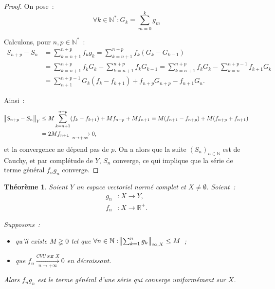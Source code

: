 \documentclass{report}
\newtheorem{thm}{Théorème}[chapter]
\theoremstyle{definition}
\theoremstyle{remark}
\numberwithin{equation}{section}
\newcommand{\R}{\mathbb R}
\newcommand{\Rp}{\R^{+}}
\newcommand{\N}{\mathbb N}
\newcommand{\Ns}{\N^{*}}
\newcommand{\seq}[3]{\left(#1_{#2}\right)_{#2 \in #3}}
\newcommand{\CONV}[5]{\xrightarrow[#2 \to #3]{#4 \text{ #5 } #1}}
\newcommand{\CVU}[3]{\CONV{#1}{#2}{#3}{CVU}{sur}}
\newcommand{\pinfty}{{+\infty}}
\newcommand{\evn}{espace vectoriel normé }
\newcommand{\evnc}{{\evn} complet }
\begin{document}
			\begin{proof} On pose~:
			\begin{equation}
				\forall k \in \Ns : G_k = \sum_{m=0}^kg_m
			\end{equation}

			Calculons, pour $n, p \in \Ns$~:
			\begin{align}
				S_{n+p} - S_n &= \sum_{k=n+1}^{n+p}f_kg_k = \sum_{k=n+1}^{n+p}f_k(G_k - G_{k-1}) \\
				&= \sum_{k=n+1}^{n+p}f_kG_k - \sum_{k=n+1}^{n+p}f_kG_{k-1} = \sum_{k=n+1}^{n+p}f_kG_k - \sum_{k=n}^{n+p-1}f_{k+1}G_k \\
				&= \sum_{n+1}^{n+p-1}G_k(f_k - f_{k+1}) + f_{n+p}G_{n+p} - f_{n+1}G_n.
			\end{align}

			Ainsi~:
			\begin{align}
				\norm {S_{n+p} - S_n}_Y &\leq M\sum_{k=n+1}^{n+p}(f_k-f_{k+1}) + Mf_{n+p} + Mf_{n+1} = M(f_{n+1}-f_{n+p}) + M(f_{n+p} + f_{n+1}) \\
				&= 2Mf_{n+1} \xrightarrow [n \to \pinfty]{} 0,
			\end{align}
			et la convergence ne dépend pas de $p$. On a alors que la suite $\seq Sn\N$ est de Cauchy, et par complétude de $Y$, $S_n$ converge, ce qui implique que la
			série de terme général $f_ng_n$ converge.
			\end{proof}

			\begin{thm} Soient $Y$ un \evnc et $X \neq \emptyset$. Soient~:
			\begin{align}
				g_n &: X \to Y, \\
				f_n &: X \to \Rp.
			\end{align}

			Supposons~:
			\begin{itemize}
				\item qu'il existe $M \gneqq 0$ tel que $\forall n \in \N : \norm {\sum_{k=1}^ng_k}_{\infty, X} \leq M$~;
				\item que $f_n \CVU Xn\pinfty 0$ en décroissant.
			\end{itemize}

			Alors $f_ng_n$ est le terme général d'une série qui converge uniformément sur $X$.
			\end{thm}
\end{document}
